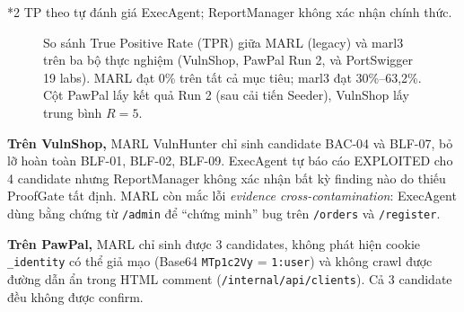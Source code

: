 \begin{flushleft}
\small{*2 TP theo tự đánh giá ExecAgent; ReportManager không xác nhận chính thức.}
\end{flushleft}

\begin{figure}[H]
\centering
{}
\caption{So sánh True Positive Rate (TPR) giữa MARL (legacy) và marl3 trên ba bộ thực nghiệm (VulnShop, PawPal Run 2, và PortSwigger 19 labs).
MARL đạt 0\% trên tất cả mục tiêu; marl3 đạt 30\%--63,2\%.
Cột PawPal lấy kết quả Run 2 (sau cải tiến Seeder), VulnShop lấy trung bình $R=5$.}
\label{fig:tpr_comparison}
\end{figure}

\textbf{Trên VulnShop,} MARL VulnHunter chỉ sinh candidate BAC-04 và BLF-07, bỏ lỡ hoàn toàn BLF-01, BLF-02, BLF-09. ExecAgent tự báo cáo EXPLOITED cho 4 candidate nhưng ReportManager không xác nhận bất kỳ finding nào do thiếu ProofGate tất định. MARL còn mắc lỗi \textit{evidence cross-contamination}: ExecAgent dùng bằng chứng từ \texttt{/admin} để ``chứng minh'' bug trên \texttt{/orders} và \texttt{/register}.

\textbf{Trên PawPal,} MARL chỉ sinh được 3 candidates, không phát hiện cookie \texttt{\_identity} có thể giả mạo (Base64 \texttt{MTp1c2Vy} = \texttt{1:user}) và không crawl được đường dẫn ẩn trong HTML comment (\texttt{/internal/api/clients}). Cả 3 candidate đều không được confirm.

